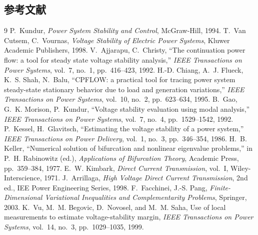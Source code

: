\subsection{参考文献}
{\renewcommand{\section}[2]{}%
\begin{thebibliography}{9}\small
{} P.~Kundur, \emph{Power System Stability and Control},
McGraw-Hill, 1994.
 T.~Van Cutsem, C.~Vournas, \emph{Voltage Stability of
Electric Power Systems}, Kluwer Academic Publishers, 1998.
 V.~Ajjarapu, C.~Christy, ``The continuation power flow:
a tool for steady state voltage stability analysis,'' \emph{IEEE Transactions on
Power Systems}, vol.~7, no.~1, pp.~416--423, 1992.
 H.-D. Chiang, A.~J. Flueck, K.~S. Shah, N.~Balu,
``CPFLOW: a practical tool for tracing power system steady-state stationary
behavior due to load and generation variations,'' \emph{IEEE Transactions on
Power Systems}, vol.~10, no.~2, pp.~623--634, 1995.
 B.~Gao, G.~K. Morison, P.~Kundur, ``Voltage stability
evaluation using modal analysis,'' \emph{IEEE Transactions on Power Systems},
vol.~7, no.~4, pp.~1529--1542, 1992.
 P.~Kessel, H.~Glavitsch, ``Estimating the voltage
stability of a power system,'' \emph{IEEE Transactions on Power Delivery},
vol.~1, no.~3, pp.~346--354, 1986.
 H.~B. Keller, ``Numerical solution of bifurcation and
nonlinear eigenvalue problems,'' in P.~H. Rabinowitz (ed.), \emph{Applications
of Bifurcation Theory}, Academic Press, pp.~359--384, 1977.
 E.~W. Kimbark, \emph{Direct Current Transmission},
vol.~I, Wiley-Interscience, 1971.
 J.~Arrillaga, \emph{High Voltage Direct Current
Transmission}, 2nd ed., IEE Power Engineering Series, 1998.
 F.~Facchinei, J.-S. Pang, \emph{Finite-Dimensional
Variational Inequalities and Complementarity Problems}, Springer, 2003.
 K.~Vu, M.~M. Begovic, D.~Novosel, and M.~M. Saha, Use of local
measurements to estimate voltage-stability margin, \emph{IEEE Transactions on
Power Systems}, vol.~14, no.~3, pp.~1029--1035, 1999.
\end{thebibliography}}
